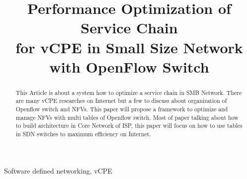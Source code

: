 \documentclass[journal]{IEEEtran}
\begin{document}
\title{Performance Optimization of Service Chain \\for vCPE in Small Size Network \\with OpenFlow Switch}



\maketitle

\begin{abstract}
This Article is about a system how to optimize a service chain in SMB Network. There are many vCPE researches on Internet but a few to discuss about organization of Openflow switch and NFVs. This paper will propose a framework to optimize and manage NFVs with multi tables of Openflow switch. Most of paper talking about how to build architecture in Core Network of ISP, this paper will focus on how to use tables in SDN switches to maximum efficiency on Internet.
\end{abstract}

\begin{IEEEkeywords}
Software defined networking, vCPE
\end{IEEEkeywords}

\IEEEpeerreviewmaketitle{}
\end{document}
